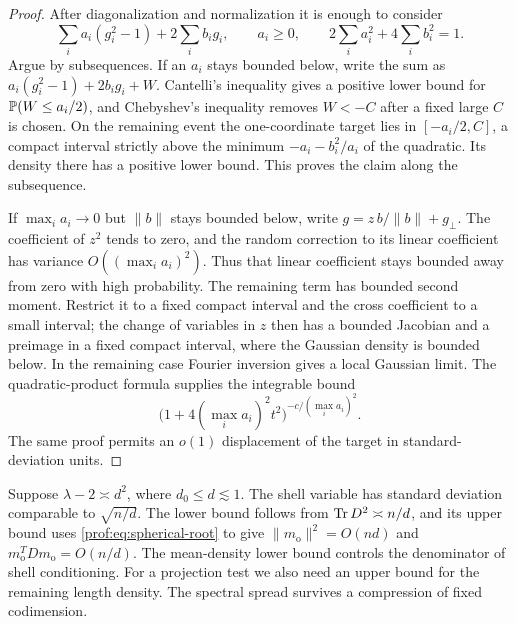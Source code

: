 \begin{proof}
After diagonalization and normalization it is enough to consider
\[
 \sum_i a_i(g_i^2-1)+2\sum_i b_i g_i,\qquad a_i\ge0,
 \qquad 2\sum_i a_i^2+4\sum_i b_i^2=1.
\]
Argue by subsequences. If an $a_i$ stays bounded below, write the sum
as $a_i(g_i^2-1)+2b_ig_i+W$. Cantelli's inequality gives a positive
lower bound for $\mathbb P(W\le a_i/2)$, and Chebyshev's inequality removes
$W<-C$ after a fixed large $C$ is chosen. On the remaining event the
one-coordinate target lies in $[-a_i/2,C]$, a compact interval strictly
above the minimum $-a_i-b_i^2/a_i$ of the quadratic. Its density there
has a positive lower bound. This proves the claim along the subsequence.

If $\max_i a_i\to0$ but $\|b\|$ stays bounded below, write
$g=z\,b/\|b\|+g_\perp$. The coefficient of $z^2$ tends to zero, and
the random correction to its linear coefficient has variance
$O((\max_i a_i)^2)$. Thus that linear coefficient stays bounded away
from zero with high probability. The remaining term has bounded second
moment. Restrict it to a fixed compact interval and the cross coefficient
to a small interval; the change of variables in $z$ then has a bounded
Jacobian and a preimage in a fixed compact interval, where the Gaussian
density is bounded below. In the remaining case Fourier inversion gives
a local Gaussian limit.  The quadratic-product formula supplies the
integrable bound
\[
 \bigl(1+4(\max_i a_i)^2t^2\bigr)^{-c/(\max_i a_i)^2}.
\]
The same proof permits an $o(1)$ displacement of the target in
standard-deviation units.
\end{proof}

Suppose $\lambda-2\asymp d^2$, where $d_0\le d\lesssim1$.
The shell variable has standard deviation comparable to $\sqrt{n/d}$.
The lower bound follows from $\operatorname{Tr} D^2\asymp n/d$, and its upper bound
uses \eqref{prof:eq:spherical-root} to give
$\|m_{\mathrm o}\|^2=O(nd)$ and
$m_{\mathrm o}^TDm_{\mathrm o}=O(n/d)$.
The mean-density lower bound controls the denominator of shell
conditioning. For a projection test we also need an upper bound for the
remaining length density. The spectral spread survives a compression
of fixed codimension.

